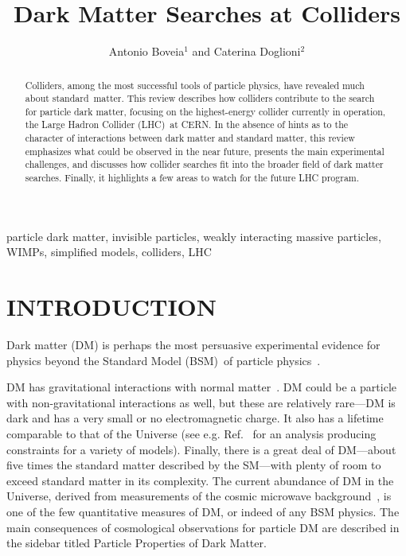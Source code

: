 \documentclass{ar-1col}
\begin{document}

\title{Dark Matter Searches at Colliders}

\author{Antonio Boveia$^1$ and Caterina Doglioni$^2$
 }

\begin{abstract}

Colliders, among the most successful tools of particle physics,
have revealed much about standard\ matter. This review describes how
colliders contribute to the search for particle dark matter,
focusing on the highest-energy collider currently in operation,
the Large Hadron Collider (LHC)\ at CERN. In the absence of hints as to the character
of interactions between dark matter and standard matter, this review emphasizes what could be observed in the
near future, presents the main experimental challenges, and discusses how
collider searches fit into the broader field of dark matter searches. Finally, it
highlights a few areas to watch for the future LHC program.
\end{abstract}

\begin{keywords}
particle dark matter, invisible particles, weakly interacting
massive particles, WIMPs, simplified models, colliders, LHC
\end{keywords}

\maketitle

\tableofcontents

\section{INTRODUCTION}\label{sec:intro}

Dark matter (DM) is perhaps the most persuasive experimental
evidence for physics beyond the Standard Model (BSM)\ of particle
physics~\cite{Bertone:2004pz}. 

DM has gravitational interactions with normal matter~\cite{Bertone:2004pz}. 
DM could be a particle with non-gravitational interactions as well,
but these are relatively rare---DM is dark and has a very small or no electromagnetic charge. 
It also has a lifetime comparable to that of the Universe (see e.g. Ref.~\cite{Cohen:2016uyg} for an analysis producing constraints for a variety of models). 
Finally, there is a great deal of DM---about five times the standard
matter described by the SM---with plenty of room to exceed standard matter in its complexity. The
current abundance of DM in the Universe, derived from
measurements of the cosmic microwave
background~\cite{Ade:2015xua}, is one of the few quantitative
measures of DM, or indeed of any BSM physics. The main consequences of cosmological observations for
particle DM are described in the sidebar titled Particle Properties of Dark Matter.
\end{document}
